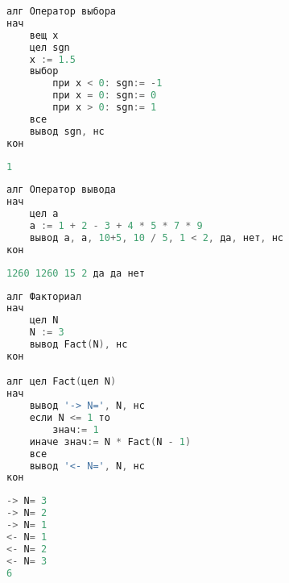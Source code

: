 \newpage

\begin{lstlisting}[language=go, caption={Пример программы с оператором выбора}]
алг Оператор выбора
нач
    вещ x
    цел sgn
    x := 1.5
    выбор
        при x < 0: sgn:= -1
        при x = 0: sgn:= 0
        при x > 0: sgn:= 1
    все
    вывод sgn, нс
кон
\end{lstlisting}

\begin{lstlisting}[language=go, caption={Результат программы с оператором выбора}]
1
\end{lstlisting}

\begin{lstlisting}[language=go, caption={Пример программы с выводом различных операций}]
алг Оператор вывода
нач
    цел a
    a := 1 + 2 - 3 + 4 * 5 * 7 * 9
    вывод a, a, 10+5, 10 / 5, 1 < 2, да, нет, нс
кон
\end{lstlisting}

\begin{lstlisting}[language=go, caption={Результат программы с выводом различных операций}]
1260 1260 15 2 да да нет 
\end{lstlisting}

\begin{lstlisting}[language=go, caption={Пример программы с рекурсией}]
алг Факториал
нач
    цел N
    N := 3
    вывод Fact(N), нс
кон

алг цел Fact(цел N)
нач
    вывод '-> N=', N, нс
    если N <= 1 то
        знач:= 1
    иначе знач:= N * Fact(N - 1)
    все
    вывод '<- N=', N, нс
кон
\end{lstlisting}

\begin{lstlisting}[language=go, caption={Результат программы с рекурсией}, label=lst:exlast]
-> N= 3 
-> N= 2 
-> N= 1 
<- N= 1 
<- N= 2 
<- N= 3 
6 
\end{lstlisting}

\newpage